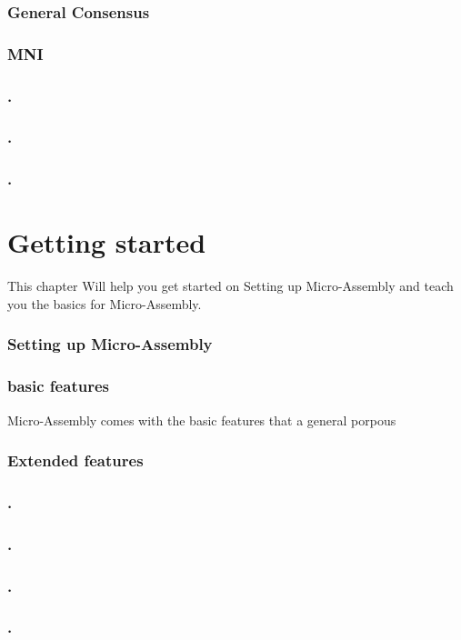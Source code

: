 \documentclass[a4paper,11pt]{book}
\begin{document}
\subsection{General Consensus}
\subsection{MNI}\label{subpar:MNI}
\subsection{.}
\subsection{.}
\subsection{.}

\chapter{Getting started}
This chapter Will help you get started on Setting up Micro-Assembly and teach you the basics for Micro-Assembly.
\subsection{Setting up Micro-Assembly}\label{setup:masm}
\subsection{basic features}
Micro-Assembly comes with the basic features that a general porpous	
\subsection{Extended features}
\subsection{.}
\subsection{.}
\subsection{.}
\subsection{.}
\end{document}
